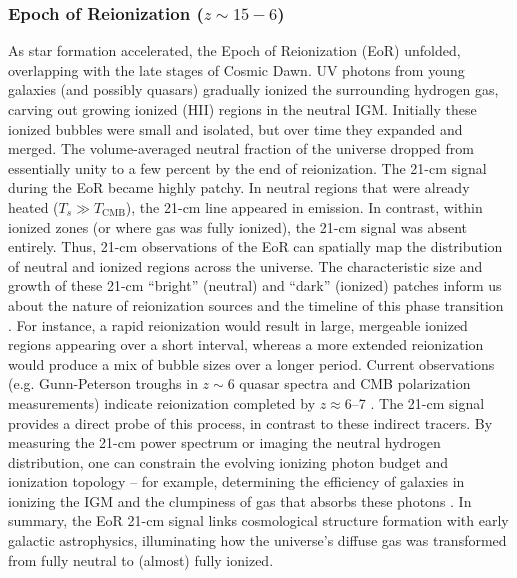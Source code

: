 \documentclass[floats,floatfix,showpacs,amssymb,prd,superscriptaddress,nofootinbib]{revtex4-2} %
\begin{document}
\subsubsection{Epoch of Reionization ($z \sim 15-6$)}
As star formation accelerated, the Epoch of Reionization (EoR) unfolded, overlapping with the late stages of Cosmic Dawn. UV photons from young galaxies (and possibly quasars) gradually ionized the surrounding hydrogen gas, carving out growing ionized (HII) regions in the neutral IGM. Initially these ionized bubbles were small and isolated, but over time they expanded and merged. The volume-averaged neutral fraction of the universe dropped from essentially unity to a few percent by the end of reionization. The 21-cm signal during the EoR became highly patchy. In neutral regions that were already heated ($T_s \gg T_{\text{CMB}}$), the 21-cm line appeared in emission. In contrast, within ionized zones (or where gas was fully ionized), the 21-cm signal was absent entirely. Thus, 21-cm observations of the EoR can spatially map the distribution of neutral and ionized regions across the universe. The characteristic size and growth of these 21-cm “bright” (neutral) and “dark” (ionized) patches inform us about the nature of reionization sources and the timeline of this phase transition \citep{McQuinn_2007, Friedrich_2011}. For instance, a rapid reionization would result in large, mergeable ionized regions appearing over a short interval, whereas a more extended reionization would produce a mix of bubble sizes over a longer period. Current observations (e.g. Gunn-Peterson troughs in $z\sim6$ quasar spectra and CMB polarization measurements) indicate reionization completed by $z\approx6$–7 \citep{Fan_2006, Planck2015results}. The 21-cm signal provides a direct probe of this process, in contrast to these indirect tracers. By measuring the 21-cm power spectrum or imaging the neutral hydrogen distribution, one can constrain the evolving ionizing photon budget and ionization topology – for example, determining the efficiency of galaxies in ionizing the IGM and the clumpiness of gas that absorbs these photons \citep{Robertson_2010, Greig_Mesinger_2017}.
In summary, the EoR 21-cm signal links cosmological structure formation with early galactic astrophysics, illuminating how the universe’s diffuse gas was transformed from fully neutral to (almost) fully ionized.
\end{document}
